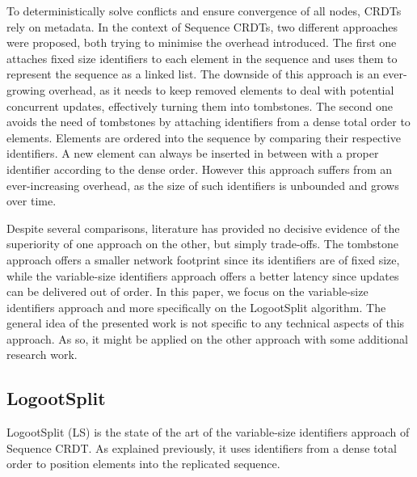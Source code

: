 \documentclass[10pt,journal,compsoc]{IEEEtran}
\begin{document}
To deterministically solve conflicts and ensure convergence of all nodes, \acp{CRDT} rely on metadata.
In the context of Sequence \acp{CRDT}, two different approaches were proposed, both trying to minimise the overhead introduced.
The first one \cite{oster:inria-00108523, Weiss_2007, ahmednacer:inria-00629503, ROH2011354, briot:hal-01343941} attaches fixed size identifiers to each element in the sequence and uses them to represent the sequence as a linked list.
The downside of this approach is an ever-growing overhead, as it needs to keep removed elements to deal with potential concurrent updates, effectively turning them into tombstones.
The second one \cite{5158449,WeissICDCS09,weiss:hal-00450416,AndreCollaborateCom2013,lseq2013,lseq2017} avoids the need of tombstones by attaching identifiers from a dense total order to elements.
Elements are ordered into the sequence by comparing their respective identifiers.
A new element can always be inserted in between with a proper identifier according to the dense order.
However this approach suffers from an ever-increasing overhead, as the size of such identifiers is unbounded and grows over time.

Despite several comparisons\cite{ahmednacer:inria-00629503,briot:hal-01343941,lseq2017}, literature has provided no decisive evidence of the superiority of one approach on the other, but simply trade-offs.
The tombstone approach offers a smaller network footprint since its identifiers are of fixed size, while the variable-size identifiers approach offers a better latency since updates can be delivered out of order.
In this paper, we focus on the variable-size identifiers approach and more specifically on the LogootSplit algorithm.
The general idea of the presented work is not specific to any technical aspects of this approach.
As so, it might be applied on the other approach with some additional research work.

\subsection{LogootSplit}

LogootSplit (LS) \cite{AndreCollaborateCom2013} is the state of the art of the variable-size identifiers approach of Sequence \ac{CRDT}.
As explained previously, it uses identifiers from a dense total order to position elements into the replicated sequence.
\end{document}
